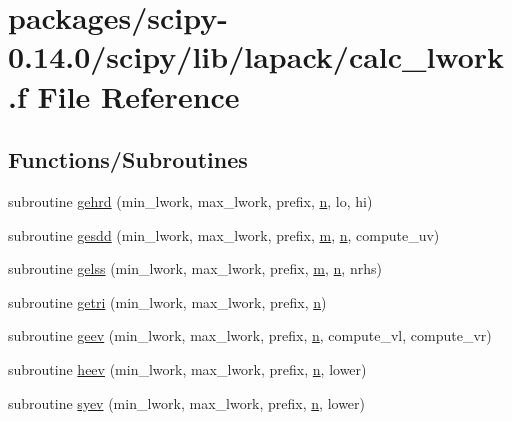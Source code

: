 \hypertarget{lib_2lapack_2calc__lwork_8f}{}\section{packages/scipy-\/0.14.0/scipy/lib/lapack/calc\+\_\+lwork.f File Reference}
\label{lib_2lapack_2calc__lwork_8f}
\subsection*{Functions/\+Subroutines}
\begin{DoxyCompactItemize}
\item 
subroutine \hyperlink{lib_2lapack_2calc__lwork_8f_ae86a9f0aca5e035a17b8476464a1e5b0}{gehrd} (min\+\_\+lwork, max\+\_\+lwork, prefix, \hyperlink{indexexpr_8h_ab427e2e2b4d6cec55fa088ea2a692ace}{n}, lo, hi)
\item 
subroutine \hyperlink{lib_2lapack_2calc__lwork_8f_aabd0abe0467e4596a4e3fa2218360d7b}{gesdd} (min\+\_\+lwork, max\+\_\+lwork, prefix, \hyperlink{indexexpr_8h_ab72fdb4031d47b75ab26dd18a437bcdc}{m}, \hyperlink{indexexpr_8h_ab427e2e2b4d6cec55fa088ea2a692ace}{n}, compute\+\_\+uv)
\item 
subroutine \hyperlink{lib_2lapack_2calc__lwork_8f_ae1caaada5b9792a0066d1e20616e40cb}{gelss} (min\+\_\+lwork, max\+\_\+lwork, prefix, \hyperlink{indexexpr_8h_ab72fdb4031d47b75ab26dd18a437bcdc}{m}, \hyperlink{indexexpr_8h_ab427e2e2b4d6cec55fa088ea2a692ace}{n}, nrhs)
\item 
subroutine \hyperlink{lib_2lapack_2calc__lwork_8f_a0e2dbd8c022170c3b6b6690870c0765b}{getri} (min\+\_\+lwork, max\+\_\+lwork, prefix, \hyperlink{indexexpr_8h_ab427e2e2b4d6cec55fa088ea2a692ace}{n})
\item 
subroutine \hyperlink{lib_2lapack_2calc__lwork_8f_a47ece4f48907a8042e0cb1881f56b0b0}{geev} (min\+\_\+lwork, max\+\_\+lwork, prefix, \hyperlink{indexexpr_8h_ab427e2e2b4d6cec55fa088ea2a692ace}{n}, compute\+\_\+vl, compute\+\_\+vr)
\item 
subroutine \hyperlink{lib_2lapack_2calc__lwork_8f_a3c991754759e50e9389c26c734c1acd0}{heev} (min\+\_\+lwork, max\+\_\+lwork, prefix, \hyperlink{indexexpr_8h_ab427e2e2b4d6cec55fa088ea2a692ace}{n}, lower)
\item 
subroutine \hyperlink{lib_2lapack_2calc__lwork_8f_ac56bbcad59c85c1352cd4c0f970c2f91}{syev} (min\+\_\+lwork, max\+\_\+lwork, prefix, \hyperlink{indexexpr_8h_ab427e2e2b4d6cec55fa088ea2a692ace}{n}, lower)

\end{DoxyCompactItemize}
